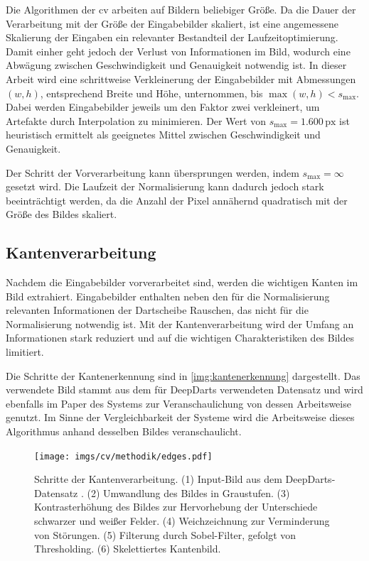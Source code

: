 Die Algorithmen der \ac{cv} arbeiten auf Bildern beliebiger Größe. Da die Dauer der Verarbeitung mit der Größe der Eingabebilder skaliert, ist eine angemessene Skalierung der Eingaben ein relevanter Bestandteil der Laufzeitoptimierung. Damit einher geht jedoch der Verlust von Informationen im Bild, wodurch eine Abwägung zwischen Geschwindigkeit und Genauigkeit notwendig ist. In dieser Arbeit wird eine schrittweise Verkleinerung der Eingabebilder mit Abmessungen $(w, h)$, entsprechend Breite und Höhe, unternommen, bis $\max (w, h) < s_\text{max}$. Dabei werden Eingabebilder jeweils um den Faktor zwei verkleinert, um Artefakte durch Interpolation zu minimieren. Der Wert von $s_\text{max} = 1.600\,\text{px}$ ist heuristisch ermittelt als geeignetes Mittel zwischen Geschwindigkeit und Genauigkeit.

Der Schritt der Vorverarbeitung kann übersprungen werden, indem $s_\text{max} = \infty$ gesetzt wird. Die Laufzeit der Normalisierung kann dadurch jedoch stark beeinträchtigt werden, da die Anzahl der Pixel annähernd quadratisch mit der Größe des Bildes skaliert.


\subsection{Kantenverarbeitung}
\label{sec:kanten}

Nachdem die Eingabebilder vorverarbeitet sind, werden die wichtigen Kanten im Bild extrahiert. Eingabebilder enthalten neben den für die Normalisierung relevanten Informationen der Dartscheibe Rauschen, das nicht für die Normalisierung notwendig ist. Mit der Kantenverarbeitung wird der Umfang an Informationen stark reduziert und auf die wichtigen Charakteristiken des Bildes limitiert.

Die Schritte der Kantenerkennung sind in \autoref{img:kantenerkennung} dargestellt. Das verwendete Bild stammt aus dem für DeepDarts verwendeten Datensatz und wird ebenfalls im Paper des Systems zur Veranschaulichung von dessen Arbeitsweise genutzt. Im Sinne der Vergleichbarkeit der Systeme wird die Arbeitsweise dieses Algorithmus anhand desselben Bildes veranschaulicht.

\begin{figure}
    \centering
    \texttt{[image: imgs/cv/methodik/edges.pdf]}
    \caption{Schritte der Kantenverarbeitung. (1) Input-Bild aus dem DeepDarts-Datensatz \cite{deepdarts-data}. (2) Umwandlung des Bildes in Graustufen. (3) Kontrasterhöhung des Bildes zur Hervorhebung der Unterschiede schwarzer und weißer Felder. (4) Weichzeichnung zur Verminderung von Störungen. (5) Filterung durch Sobel-Filter, gefolgt von Thresholding. (6) Skelettiertes Kantenbild.}
    \label{img:kantenerkennung}
\end{figure}

